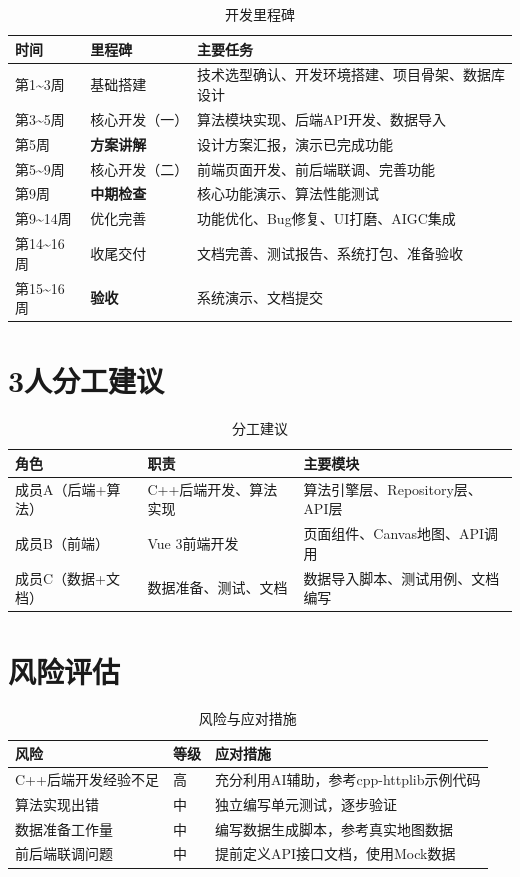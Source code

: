 \documentclass[12pt,a4paper]{report}
\begin{document}
\begin{table}[H]
\centering
\caption{开发里程碑}
\small
\begin{tabularx}{\textwidth}{llX}
\toprule
\textbf{时间} & \textbf{里程碑} & \textbf{主要任务} \\
\midrule
第1\textasciitilde3周 & 基础搭建 & 技术选型确认、开发环境搭建、项目骨架、数据库设计 \\
第3\textasciitilde5周 & 核心开发（一） & 算法模块实现、后端API开发、数据导入 \\
第5周 & \textbf{方案讲解} & 设计方案汇报，演示已完成功能 \\
第5\textasciitilde9周 & 核心开发（二） & 前端页面开发、前后端联调、完善功能 \\
第9周 & \textbf{中期检查} & 核心功能演示、算法性能测试 \\
第9\textasciitilde14周 & 优化完善 & 功能优化、Bug修复、UI打磨、AIGC集成 \\
第14\textasciitilde16周 & 收尾交付 & 文档完善、测试报告、系统打包、准备验收 \\
第15\textasciitilde16周 & \textbf{验收} & 系统演示、文档提交 \\
\bottomrule
\end{tabularx}
\end{table}

\section{3人分工建议}

\begin{table}[H]
\centering
\caption{分工建议}
\begin{tabularx}{\textwidth}{l X X}
\toprule
\textbf{角色} & \textbf{职责} & \textbf{主要模块} \\
\midrule
成员A（后端+算法） & C++后端开发、算法实现 & 算法引擎层、Repository层、API层 \\
成员B（前端） & Vue 3前端开发 & 页面组件、Canvas地图、API调用 \\
成员C（数据+文档） & 数据准备、测试、文档 & 数据导入脚本、测试用例、文档编写 \\
\bottomrule
\end{tabularx}
\end{table}

\section{风险评估}

\begin{table}[H]
\centering
\caption{风险与应对措施}
\small
\begin{tabularx}{\textwidth}{l l X}
\toprule
\textbf{风险} & \textbf{等级} & \textbf{应对措施} \\
\midrule
C++后端开发经验不足 & 高 & 充分利用AI辅助，参考cpp-httplib示例代码 \\
算法实现出错 & 中 & 独立编写单元测试，逐步验证 \\
数据准备工作量 & 中 & 编写数据生成脚本，参考真实地图数据 \\
前后端联调问题 & 中 & 提前定义API接口文档，使用Mock数据 \\
\bottomrule
\end{tabularx}
\end{table}
\end{document}
